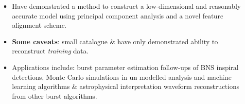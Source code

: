 \documentclass[a0,landscape]{a0poster}
\begin{document}
\begin{multicols}{4}
\begin{itemize}
\item Have demonstrated a method to construct a low-dimensional and reasonably
    accurate model using principal component analysis and a novel feature
    alignment scheme.
\item {\bf Some caveats}: small catalogue \& have only demonstrated ability to
    reconstruct \emph{training} data.
\item Applications include: burst parameter estimation follow-ups of BNS inspiral
    detections, Monte-Carlo simulations in un-modelled analysis
    and machine learning algorithms \& astrophysical interpretation waveform
    reconstructions from other burst algorithms.
\end{itemize}




\small{
}





\end{multicols}
\end{document}
